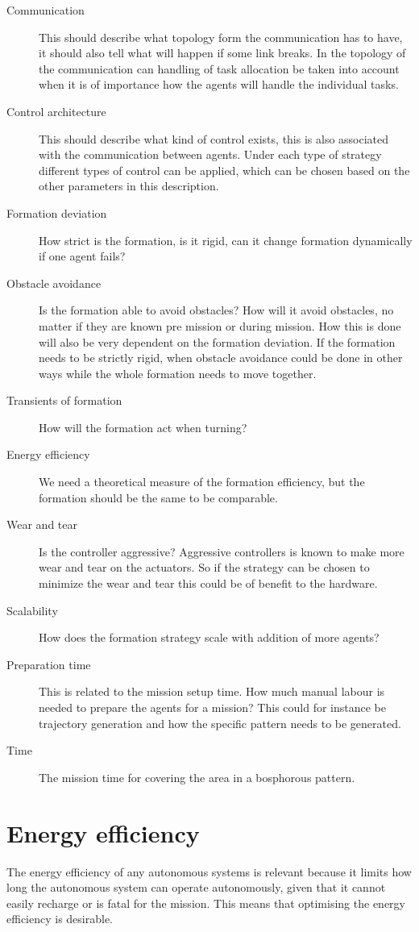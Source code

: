 \begin{description}
\item[Communication] This should describe what topology form the communication has to have, it should also tell what will happen if some link breaks. In the topology of the communication can handling of task allocation be taken into account when it is of importance how the agents will handle the individual tasks.
\item[Control architecture] This should describe what kind of control exists, this is also associated with the communication between agents. Under each type of strategy different types of control can be applied, which can be chosen based on the other parameters in this description.
\item[Formation deviation] How strict is the formation, is it rigid, can it change formation dynamically if one agent fails?
\item[Obstacle avoidance] Is the formation able to avoid obstacles? How will it avoid obstacles, no matter if they are known pre mission or during mission. How this is done will also be very dependent on the formation deviation. If the formation needs to be strictly rigid, when obstacle avoidance could be done in other ways while the whole formation needs to move together.
\item[Transients of formation] How will the formation act when turning?
\item[Energy efficiency] We need a theoretical measure of the formation efficiency, but the formation should be the same to be comparable.
\item[Wear and tear] Is the controller aggressive? Aggressive controllers is known to make more wear and tear on the actuators. So if the strategy can be chosen to minimize the wear and tear this could be of benefit to the hardware.
\item[Scalability] How does the formation strategy scale with addition of more agents?
\item[Preparation time] This is related to the mission setup time. How much manual labour is needed to prepare the agents for a mission? This could for instance be trajectory generation and how the specific pattern needs to be generated.
\item[Time] The mission time for covering the area in a bosphorous pattern.
\end{description}

\section{Energy efficiency}
The energy efficiency of any autonomous systems is relevant because it limits how long the autonomous system can operate autonomously, given that it cannot easily recharge or is fatal for the mission. This means that optimising the energy efficiency is desirable.

